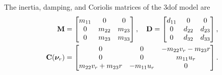 The inertia, damping, and Coriolis matrices of the 3\gls{dof} model are \cite{fredriksen_global_2006}
\begin{align}
    \mathbf{M} &= 
    \begin{bmatrix}
        m_{11} & 0 & 0 \\ 0 & m_{22} & m_{23} \\ 0 & m_{23} & m_{33}
    \end{bmatrix}, \quad
    \mathbf{D} =
    \begin{bmatrix}
        d_{11} & 0 & 0 \\ 0 & d_{22} & d_{23} \\ 0 & d_{32} & d_{33}
    \end{bmatrix}, \\
    \mathbf{C}(\bm{\nu}_r) &=
    \begin{bmatrix}
        0 & 0 & -m_{22}v_r - m_{23}r \\ 0 & 0 & m_{11}u_r \\ m_{22}v_r + m_{23}r & -m_{11}u_r & 0
    \end{bmatrix}.
\end{align}

